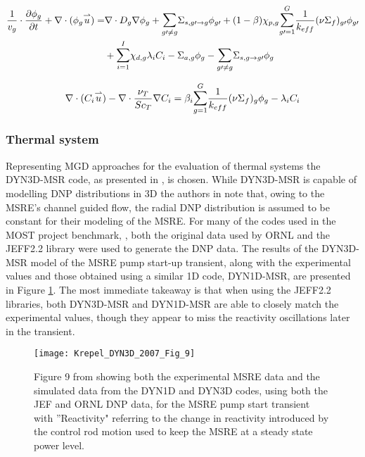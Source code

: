 \documentclass[review]{elsarticle}
\begin{document}
\begin{equation}
\label{eq:mgd}
\begin{split}
\frac{1}{v_{g}} \cdot \frac{\partial \phi_{g}}{\partial t} + \nabla \cdot
    (\phi_{g} \overset{\rightharpoonup}u) = & \nabla \cdot D_{g} \nabla \phi_{g}
    + \mathlarger{\sum}_{g \prime \not= g} \Sigma_{s,g \prime \rightarrow g}
    \phi_{g \prime} + (1-\beta)\chi_{p,g}
    \mathlarger{\sum}_{g \prime = 1}^{G}\frac{1}{k_{eff}}
    (\nu \Sigma_{f})_{g \prime}\phi_{g\prime}\\ &+ 
    \mathlarger{\sum}_{i = 1}^{I}\chi_{d,g}\lambda_{i}C_{i} 
     - \Sigma_{a,g}\phi_{g} - \mathlarger{\sum}_{g \prime \not= g} 
    \Sigma_{s,g \rightarrow g \prime} \phi_{g} 
\end{split}
\end{equation}

\begin{equation}
\label{eq:mgd_dnp}
\nabla \cdot (C_{i} \overset{\rightharpoonup}u) - 
    \nabla \cdot \frac{\nu_{T}}{Sc_{T}}\nabla C_{i}
    = \beta_{i} \mathlarger{\sum}_{g = 1}^{G} \frac{1}{k_{eff}} 
    (\nu \Sigma_{f})_{g} \phi_{g} - \lambda_{i} C_{i}
\end{equation}

\subsubsection{Thermal system} \label{sssec:mgd_ts}
Representing MGD approaches for the evaluation of thermal systems the DYN3D-MSR
code, as presented in \cite{krepel_dyn3d-msr_2007}, is chosen. While DYN3D-MSR is
capable of modelling DNP distributions in 3D the authors in
\cite{krepel_dyn3d-msr_2007} note that, owing to the MSRE's channel guided flow,
the radial DNP distribution is assumed to be constant for their modeling of the
MSRE. For many of the codes used in the
MOST project benchmark, \cite{delpech_benchmark_2003}, both the original data used
by ORNL and the JEFF2.2 library were used to generate the DNP data.
The results of the DYN3D-MSR model of the MSRE pump start-up transient,
along with the experimental values and those obtained using a similar 1D code,
DYN1D-MSR, are presented in Figure \ref{fig:krepel_dyn3d_msre_pump_start}. The most
immediate takeaway is that when using the JEFF2.2 libraries, both DYN3D-MSR and
DYN1D-MSR are able to closely match the experimental values, though they appear to
miss the reactivity oscillations later in the transient.

\begin{figure}[H]
   \centering
   \texttt{[image: Krepel\_DYN3D\_2007\_Fig\_9]}
   \caption{Figure 9 from \cite{krepel_dyn3d-msr_2007} showing both the experimental MSRE data
   and the simulated data from the DYN1D and DYN3D codes, using both the JEF and ORNL DNP data, for
   the MSRE pump start transient with ''Reactivity" referring to the change in reactivity introduced
   by the control rod motion used to keep the MSRE at a steady state power level.} 
   \label{fig:krepel_dyn3d_msre_pump_start}
\end{figure}
\end{document}
